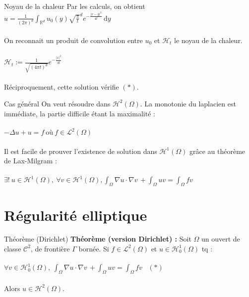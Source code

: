 \documentclass[10pt]{beamer}
\begin{document}
\begin{frame}{Noyau de la chaleur}
Par les calculs, on obtient $u=\frac{1}{(2\pi)^d}  \displaystyle \int_{\mathbb{R}^d} u_0(y)\sqrt{\frac{\pi}{t}}^d e^{-\frac{|x-y|^2}{4t}} \, \mathrm{d}y $\\ ~ \\ 
On reconnait un produit de convolution entre $u_0$ et $\mathcal{H}_t$ le noyau de la chaleur. \\ ~ \\ 

$\mathcal{H}_t := \frac{1}{\sqrt{(4\pi t)^d}} e^{-\frac{|x|^2}{4t}}$ \\ ~ \\ 

Réciproquement, cette solution vérifie $(*)$.
\end{frame}


\begin{frame}{Cas général}
On veut résoudre dans $\mathcal{H}^2(\Omega)$. La monotonie du laplacien est immédiate, la partie difficile étant la maximalité : \\ ~ \\ 
$-\Delta u +u = f \ \text{où} \ f \in \mathcal{L}^2(\Omega) $   \\ ~ \\ 
Il est facile de prouver l'existence de solution dans $\mathcal{H}^1(\Omega)$ grâce au théorème de Lax-Milgram :\\ ~ \\ 
$\exists !\  u\in\mathcal{H}^1(\Omega), \ \forall v \in \mathcal{H}^1(\Omega), \displaystyle \int_{\Omega} \nabla u \cdot \nabla v \,  + \int_{\Omega} u v =  \int_{\Omega} f v  \, $
\end{frame}



\section{Régularité elliptique}

\begin{frame}{Théorème (Dirichlet)}
\textbf{Théorème (version Dirichlet) :} Soit $\Omega$ un ouvert de classe $\mathcal{C}^2$, de frontière $\Gamma$ bornée. Si $f \in \mathcal{L}^2(\Omega)$ et $u\in \mathcal{H}^1_0(\Omega)$ tq : \\ ~ \\  $\forall v \in \mathcal{H}^1_0(\Omega), \ \displaystyle \int_{\Omega} \nabla u \cdot \nabla v \,  + \int_{\Omega} u v =  \int_{\Omega} f v  \, \ \ \ (*) $\\ ~ \\ 
Alors $u\in \mathcal{H}^2(\Omega)$.
\end{frame}
\end{document}
